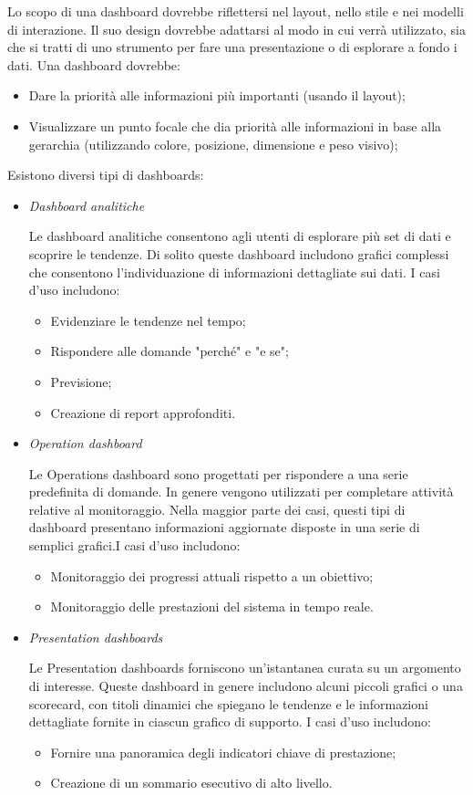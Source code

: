 \documentclass[12pt, a4paper]{report}
\begin{document}
	Lo scopo di una dashboard dovrebbe riflettersi nel layout, nello stile e nei modelli di interazione. Il suo design dovrebbe adattarsi al modo in cui verrà utilizzato, sia che si tratti di uno strumento per fare una presentazione o di esplorare a fondo i dati. Una dashboard dovrebbe:
	\begin{itemize}
		\item Dare la priorità alle informazioni più importanti (usando il layout);
		\item Visualizzare un punto focale che dia priorità alle informazioni in base alla gerarchia (utilizzando colore, posizione, dimensione e peso visivo);
	\end{itemize}
	Esistono diversi tipi di dashboards:
	\begin{itemize}
		\item \textit{Dashboard analitiche}

		Le dashboard analitiche consentono agli utenti di esplorare più set di dati e scoprire le tendenze. Di solito queste dashboard includono grafici complessi che consentono l'individuazione di informazioni dettagliate sui dati. I casi d'uso includono:
		\begin{itemize}
			\item Evidenziare le tendenze nel tempo;
			\item Rispondere alle domande "perché" e "e se";
			\item Previsione;
			\item Creazione di report approfonditi.
		\end{itemize}
		\item \textit{Operation dashboard}

		Le Operations dashboard sono progettati per rispondere a una serie predefinita di domande. In genere vengono utilizzati per completare attività relative al monitoraggio. Nella maggior parte dei casi, questi tipi di dashboard presentano informazioni aggiornate disposte in una serie di semplici grafici.I casi d'uso includono:
		\begin{itemize}
			\item Monitoraggio dei progressi attuali rispetto a un obiettivo;
			\item Monitoraggio delle prestazioni del sistema in tempo reale.
		\end{itemize}
		\item \textit{Presentation dashboards}

		Le Presentation dashboards forniscono un'istantanea curata su un argomento di interesse. Queste dashboard in genere includono alcuni piccoli grafici o una scorecard, con titoli dinamici che spiegano le tendenze e le informazioni dettagliate fornite in ciascun grafico di supporto. I casi d'uso includono:
		\begin{itemize}
			\item Fornire una panoramica degli indicatori chiave di prestazione;
			\item Creazione di un sommario esecutivo di alto livello.
		\end{itemize}
	\end{itemize}
\end{document}
